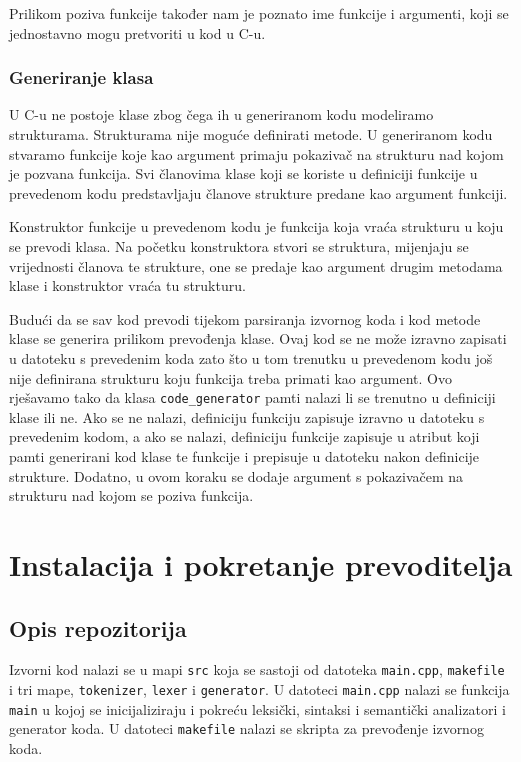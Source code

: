 \documentclass[times, utf8, zavrsni]{fer}
\begin{document}
Prilikom poziva funkcije također nam je poznato ime funkcije i argumenti, koji se jednostavno mogu
pretvoriti u kod u C-u.

\subsection{Generiranje klasa}
U C-u ne postoje klase zbog čega ih u generiranom kodu modeliramo strukturama.
Strukturama nije moguće definirati metode. U generiranom kodu stvaramo funkcije
koje kao argument primaju pokazivač na strukturu nad kojom je pozvana funkcija.
Svi članovima klase koji se koriste u definiciji funkcije u prevedenom kodu predstavljaju
članove strukture predane kao argument funkciji. 

Konstruktor funkcije u prevedenom kodu je funkcija koja vraća strukturu u koju se prevodi klasa. Na početku konstruktora stvori
se struktura, mijenjaju se vrijednosti članova te strukture, one se predaje kao argument drugim metodama klase i konstruktor
vraća tu strukturu.

Budući da se sav kod prevodi tijekom parsiranja izvornog koda i kod metode klase
se generira prilikom prevođenja klase. Ovaj kod se ne može izravno zapisati u datoteku s prevedenim koda zato što u
tom trenutku u prevedenom kodu još nije definirana strukturu koju funkcija treba primati kao argument. Ovo rješavamo tako da
klasa \verb|code_generator| pamti nalazi li se trenutno u definiciji klase ili ne. Ako se ne nalazi, definiciju funkciju zapisuje izravno
u datoteku s prevedenim kodom, a ako se nalazi, definiciju funkcije zapisuje u atribut koji pamti generirani kod klase te funkcije i prepisuje u datoteku nakon
definicije strukture. Dodatno, u ovom koraku se dodaje argument s pokazivačem na strukturu nad kojom se poziva funkcija.

\chapter{Instalacija i pokretanje prevoditelja}
\section{Opis repozitorija}
Izvorni kod nalazi se u mapi \verb|src| koja se sastoji od datoteka \verb|main.cpp|, \verb|makefile| i tri mape, \verb|tokenizer|, \verb|lexer| i \verb|generator|.
U datoteci \verb|main.cpp| nalazi se funkcija \verb|main| u kojoj se inicijaliziraju i pokreću leksički, sintaksi i semantički analizatori i generator koda.
U datoteci \verb|makefile| nalazi se skripta za prevođenje izvornog koda.
\end{document}
